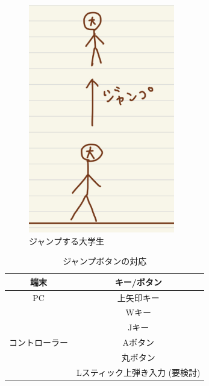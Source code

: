 \documentclass[12pt]{jsarticle}
\begin{document}
\begin{figure}[htbp]
  \begin{center}
    \includegraphics[height=10cm]{imags/jumpDiscription.eps}
    \caption{ジャンプする大学生}
  \end{center}
\end{figure}

\newpage

\begin{table}[htbp]
  \centering
  \caption{ジャンプボタンの対応}
  \begin{tabular}{c|c}
    端末 & キー/ボタン \\
    \hline
    PC & 上矢印キー \\
      & Wキー \\
      & Jキー \\
    \hline
    コントローラー & Aボタン \\
      & 丸ボタン \\
      & Lスティック上弾き入力 (要検討) \\
  \end{tabular}
\end{table}
\end{document}
